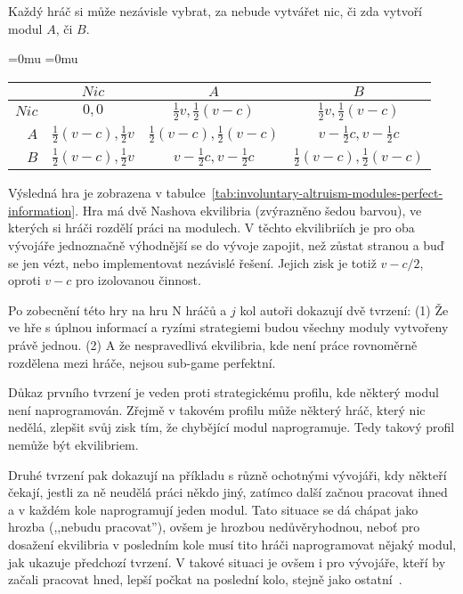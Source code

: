 \begin{multicols}{2}
		Každý hráč si může nezávisle vybrat, za nebude vytvářet nic, či zda vytvoří modul $A$, či $B$.

		\begin{Figure}
		\begin{center}
		\begingroup
		\setlength\extrarowheight{2pt}
		\medmuskip=0mu
		\thickmuskip=0mu
			\makeatletter\def\f@size{9}
		\begin{tabular}{r| c c c}
				& $Nic$ & $A$ & $B$ \\
				\hline
			$Nic$ &
			 	$0,0$ &
				$\frac{1}{2}v, \frac{1}{2}(v-c)$ &
				$\frac{1}{2}v, \frac{1}{2}(v-c)$ \\
			$A$ &
				$\frac{1}{2}(v-c), \frac{1}{2}v$ &
				$\frac{1}{2}(v-c), \frac{1}{2}(v-c)$ &
				\cellcolor{gray!25}$v-\frac{1}{2}c, v-\frac{1}{2}c$ \\
			$B$ &
				$\frac{1}{2}(v-c), \frac{1}{2}v$ &
				\cellcolor{gray!25}$v-\frac{1}{2}c, v-\frac{1}{2}c$ &
				$\frac{1}{2}(v-c), \frac{1}{2}(v-c)$ \\
		\end{tabular}
		\endgroup
		\end{center}
		\label{tab:involuntary-altruism-modules-perfect-information}
		\end{Figure}

		Výsledná hra je zobrazena v tabulce~\ref{tab:involuntary-altruism-modules-perfect-information}. Hra má dvě Nashova ekvilibria (zvýrazněno šedou barvou), ve kterých si hráči rozdělí práci na modulech. V těchto ekvilibriích je pro oba vývojáře jednoznačně výhodnější se do vývoje zapojit, než zůstat stranou a buď se jen vézt, nebo implementovat nezávislé řešení. Jejich zisk je totiž $v - c/2$, oproti $v-c$ pro izolovanou činnost.

		Po zobecnění této hry na hru N hráčů a $j$ kol autoři dokazují dvě tvrzení: (1) Že ve hře s úplnou informací a ryzími strategiemi budou všechny moduly vytvořeny právě jednou. (2) A že nespravedlivá ekvilibria, kde není práce rovnoměrně rozdělena mezi hráče, nejsou sub-game perfektní.

		Důkaz prvního tvrzení je veden proti strategickému profilu, kde některý modul není naprogramován. Zřejmě v takovém profilu může některý hráč, který nic nedělá, zlepšit svůj zisk tím, že chybějící modul naprogramuje. Tedy takový profil nemůže být ekvilibriem.

		Druhé tvrzení pak dokazují na příkladu s různě ochotnými vývojáři, kdy někteří čekají, jestli za ně neudělá práci někdo jiný, zatímco další začnou pracovat ihned a v každém kole naprogramují jeden modul. Tato situace se dá chápat jako hrozba (,,nebudu pracovat''), ovšem je hrozbou nedůvěryhodnou, neboť pro dosažení ekvilibria v posledním kole musí tito hráči  naprogramovat nějaký modul, jak ukazuje předchozí tvrzení. V takové situaci je ovšem i pro vývojáře, kteří by začali pracovat hned, lepší počkat na poslední kolo, stejně jako ostatní~\cite[kap. 4.1]{architecture-opensource}.


\end{multicols}
